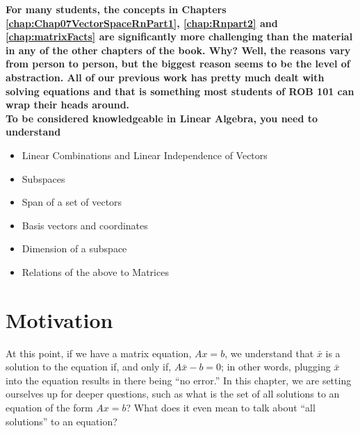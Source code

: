 \begin{tcolorbox}[sharp corners, colback=yellow!30, colframe=yellow!80!red, title=\textcolor{red}{\Large \bf Warning! Theory Ahead!! Additional Study Time May Be Required}] 
\bf For many students, the concepts in Chapters \ref{chap:Chap07VectorSpaceRnPart1}, \ref{chap:Rnpart2} and \ref{chap:matrixFacts} are significantly more challenging than the material in any of the other chapters of the book. Why? Well, the reasons vary from person to person, but the biggest reason seems to be the level of abstraction. All of our previous work has pretty much dealt with solving equations and that is something most students of ROB 101 can wrap their heads around. \\

To be considered knowledgeable in Linear Algebra, you need to understand
\begin{itemize}
    \item Linear Combinations and Linear Independence of Vectors
    \item Subspaces
     \item Span of a set of vectors
    \item Basis vectors and coordinates
    \item Dimension of a subspace
    \item Relations of the above to Matrices
\end{itemize}

\end{tcolorbox}


\newpage

\section{Motivation}

At this point, if we have a matrix equation, $Ax=b$, we understand that $\bar{x}$ is a solution to the equation if, and only if, $A\bar{x}-b=0$; in other words, plugging $\bar{x}$ into the equation results in there being ``no error.'' In this chapter, we are setting ourselves up for deeper questions, such as what is the set of all solutions to an equation of the form $Ax=b$? What does it even mean to talk about ``all solutions'' to an equation? \\


